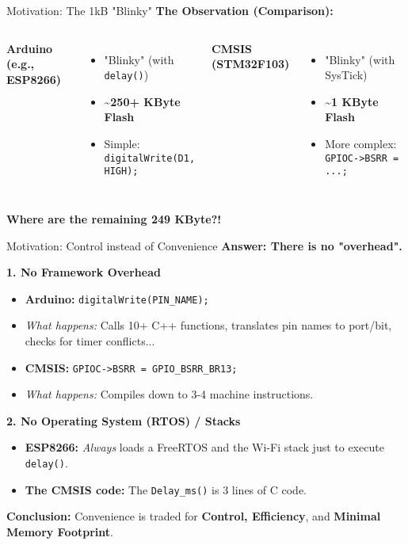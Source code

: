 \documentclass{beamer}
\begin{document}
\begin{frame}{Motivation: The 1kB "Blinky"}
	\textbf{The Observation (Comparison):}
	
	\medskip
	\begin{columns}
		\textbf{Arduino (e.g., ESP8266)}
		\begin{itemize}
			\item "Blinky" (with \texttt{delay()})
			\item \textbf{\sim 250+ KByte Flash}
			\item Simple: \texttt{digitalWrite(D1, HIGH);}
		\end{itemize}
		
		\textbf{CMSIS (STM32F103)}
		\begin{itemize}
			\item "Blinky" (with SysTick)
			\item \textbf{\sim 1 KByte Flash}
			\item More complex: \texttt{GPIOC->BSRR = ...;}
		\end{itemize}
	\end{columns}
	
	\bigskip
	\begin{center}
		\Large\textbf{Where are the remaining 249 KByte?!}
	\end{center}
\end{frame}

\begin{frame}[fragile]{Motivation: Control instead of Convenience}
	\textbf{Answer: There is no "overhead".}
	
	\medskip
	\textbf{1. No Framework Overhead}
	\begin{itemize}
		\item \textbf{Arduino:} \texttt{digitalWrite(PIN\_NAME);}
		\item \textit{What happens:} Calls 10+ C++ functions, translates pin names to port/bit, checks for timer conflicts...
		\item \textbf{CMSIS:} \texttt{GPIOC->BSRR = GPIO\_BSRR\_BR13;}
		\item \textit{What happens:} Compiles down to 3-4 machine instructions.
	\end{itemize}
	
	\medskip
	\textbf{2. No Operating System (RTOS) / Stacks}
	\begin{itemize}
		\item \textbf{ESP8266:} \emph{Always} loads a FreeRTOS and the Wi-Fi stack just to execute \texttt{delay()}.
		\item \textbf{The CMSIS code:} The \texttt{Delay\_ms()} is 3 lines of C code.
	\end{itemize}
	
	\medskip
	\rightarrow \textbf{Conclusion:} Convenience is traded for \textbf{Control, Efficiency}, and \textbf{Minimal Memory Footprint}.
\end{frame}
\end{document}
